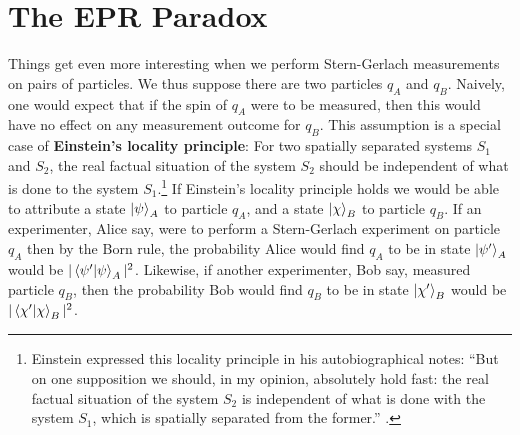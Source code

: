\section{The EPR Paradox}
Things get even more interesting when we perform Stern-Gerlach measurements on pairs of particles. We thus suppose there are two particles $q_A$ and $q_B$. Naively, one would expect that if the spin of $q_A$ were to be measured, then this would have no effect on any measurement outcome for $q_B$. This assumption is a special case of \textbf{Einstein's locality principle}: For two spatially separated systems $S_1$ and $S_2$,  the real factual situation of the system $S_2$ should be independent of what is done to the system $S_1$.\footnote{Einstein expressed this locality principle in his autobiographical notes: ``But on one supposition we should, in my opinion, absolutely hold fast: the real factual situation of the system $S_2$ is independent of what is done with the system $S_1$, which is spatially separated from the former.'' \cite[p. 85]{EinsteinLocality}.} If Einstein's locality principle holds we would be able to attribute a state $\ket{\psi}_A$ to particle $q_A$, and a state $\ket{\chi}_B$ to particle $q_B$. If an experimenter, Alice say, were to perform a Stern-Gerlach experiment on particle $q_A$ then by the Born rule, the probability Alice would find $q_A$ to be in state $\ket{\psi'}_A$ would be $|\ip{\psi'}{\psi}_A|^2$. Likewise, if another  experimenter, Bob say, measured particle $q_B$, then the probability Bob would find $q_B$ to be in state $\ket{\chi'}_B$ would be $|\ip{\chi'}{\chi}_B|^2$. 

